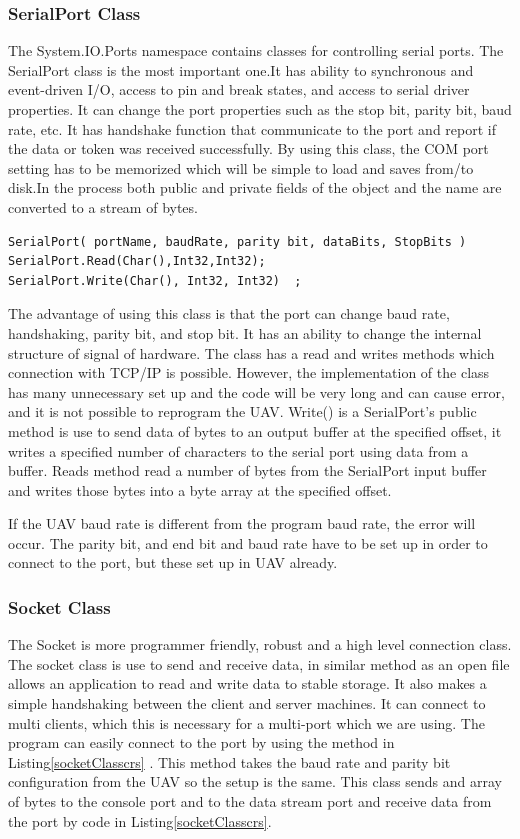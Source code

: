\subsubsection{SerialPort Class}
The System.IO.Ports namespace contains classes for controlling serial ports. The SerialPort class is the most important one.It has ability to synchronous and event-driven I/O, access to pin and break states, and access to serial driver properties\cite{peak_netFrame}. It can change the port properties such as the stop bit, parity bit, baud rate, etc. It has handshake function that communicate to the port and report if the data or token was received successfully.
By using this class, the COM port setting has to be memorized which will be simple to load and saves from/to disk.In the process both public and private fields of the object and the name are converted to a stream of bytes.

\begin{lstlisting}[caption=Serial Port class connection\, read and write method, label=serialPortconn]
SerialPort( portName, baudRate, parity bit, dataBits, StopBits ) 
SerialPort.Read(Char(),Int32,Int32);
SerialPort.Write(Char(), Int32, Int32)	;
\end{lstlisting}

The advantage of using this class is that the port can change baud rate, handshaking, parity bit, and stop bit. It has an ability to change the internal structure of signal of hardware. The class has a read and writes methods which connection with TCP/IP is possible.
However, the implementation of the class has many unnecessary set up and the code will be very long and can cause error, and it is not possible to reprogram the UAV.
Write() is a SerialPort's public method is use to send data of bytes to an output buffer at the specified offset, it writes a specified number of characters to the serial port using data from a buffer.
Reads method read a number of bytes from the SerialPort input buffer and writes those bytes into a byte array at the specified offset.

If the UAV baud rate is different from the program baud rate, the error will occur.
The parity bit, and end bit and baud rate have to be set up in order to connect to the port, but these set up in UAV already.
\subsubsection{Socket Class}
The Socket is more programmer friendly, robust and a high level connection class. The socket class is use to send and receive data, in similar method as an open file allows an application to read and write data to stable storage.  It also makes a simple handshaking between the client and server machines. It can connect to multi clients, which this is necessary for a multi-port which we are using. The program can easily connect to the port by using the method in Listing\ref{socketClasscrs} .
This method takes the baud rate and parity bit configuration from the UAV so the setup is the same. This class sends and array of bytes to the console port and to the data stream port and receive data from the port by code in Listing\ref{socketClasscrs}.

